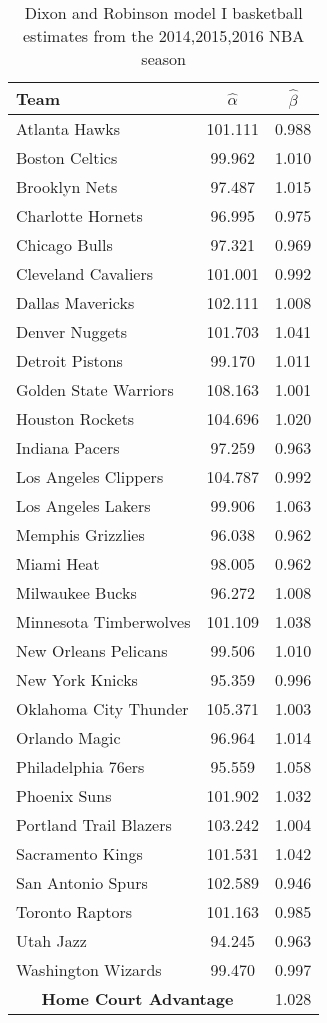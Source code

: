 \begin{table}[t]
\centering
\caption{Dixon and Robinson model I basketball estimates from the 2014,2015,2016 NBA season}
\begin{tabular}{|l|c|c|}
\hline
\textbf{Team}  & \textbf{$\hat{\alpha}$} & \textbf{$\hat{\beta}$} \\ \hline
Atlanta Hawks  & 101.111 & 0.988\\ \hline
Boston Celtics & 99.962 & 1.010\\ \hline
Brooklyn Nets  & 97.487 & 1.015\\ \hline
Charlotte Hornets & 96.995 & 0.975\\ \hline
Chicago Bulls & 97.321 & 0.969\\ \hline
Cleveland Cavaliers & 101.001 & 0.992\\ \hline
Dallas Mavericks & 102.111 & 1.008 \\ \hline
Denver Nuggets & 101.703 & 1.041\\ \hline
Detroit Pistons & 99.170 & 1.011\\ \hline
Golden State Warriors & 108.163 & 1.001\\ \hline
Houston Rockets & 104.696 & 1.020 \\ \hline
Indiana Pacers & 97.259 & 0.963 \\ \hline
Los Angeles Clippers & 104.787 & 0.992\\ \hline
Los Angeles Lakers & 99.906 & 1.063 \\ \hline
Memphis Grizzlies & 96.038 & 0.962\\ \hline
Miami Heat & 98.005 & 0.962 \\ \hline
Milwaukee Bucks & 96.272 & 1.008\\ \hline
Minnesota Timberwolves & 101.109 & 1.038\\ \hline
New Orleans Pelicans & 99.506 & 1.010\\ \hline
New York Knicks & 95.359 & 0.996\\ \hline
Oklahoma City Thunder & 105.371 & 1.003\\ \hline
Orlando Magic & 96.964 & 1.014\\ \hline
Philadelphia 76ers & 95.559 & 1.058\\ \hline
Phoenix Suns & 101.902 & 1.032\\ \hline
Portland Trail Blazers & 103.242 & 1.004\\ \hline
Sacramento Kings & 101.531  & 1.042\\ \hline
San Antonio Spurs & 102.589 & 0.946\\ \hline
Toronto Raptors & 101.163 & 0.985 \\ \hline
Utah Jazz & 94.245 & 0.963 \\ \hline
Washington Wizards & 99.470  & 0.997\\ \hline
\multicolumn{2}{|c|}{\textbf{Home Court Advantage}} & 1.028\\ \hline
\end{tabular}
\label{table:dr_1_141516}
\end{table}